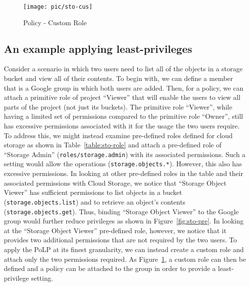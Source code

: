 \begin{figure}[h]
\centering
\texttt{[image: pic/sto-cus]}
\caption {Policy - Custom Role}
 \label{fig:sto-cus}
\end{figure}

\subsection{An example applying least-privileges}
Consider a scenario in which two users need to list all of the objects in a storage bucket and view all of their contents.  To
begin with, we can define a member that is a Google group in which both users are added.  Then, for a policy, we can attach
a primitive role of project ``Viewer'' that will enable the users to view all parts of the project (not just its buckets).
The primitive role ``Viewer'', while having a limited set of permissions compared to the
primitive role ``Owner'', still has excessive permissions associated with it for the usage the two users require.
To address this, we might instead examine pre-defined roles defined for cloud storage as shown in Table~\ref{table:sto-role}
and attach a pre-defined role of ``Storage Admin'' ({\tt roles/storage.admin}) with its associated permissions.  Such a
setting would allow the operations ({\tt storage.objects.*}).  However, this also has excessive 
permissions. In looking at other pre-defined roles in the table and
their associated permissions with Cloud Storage, we notice that ``Storage Object Viewer'' has sufficient permissions
to list objects in a bucket ({\tt storage.objects.list}) and to retrieve an object's contents ({\tt storage.objects.get}).
Thus, binding ``Storage Object Viewer''
to the Google group would further reduce privileges as shown in Figure~\ref{fig:sto-pre}.
In looking at the ``Storage Object Viewer'' pre-defined role, however, we notice
that it provides two additional permissions that are not required by the two users.  To apply the PoLP at its finest granularity,
we can instead create a custom role and attach only the two permissions required.  As Figure~\ref{fig:sto-cus}, a custom role can then be defined
and a policy can be attached to the group in order to provide a least-privilege setting.